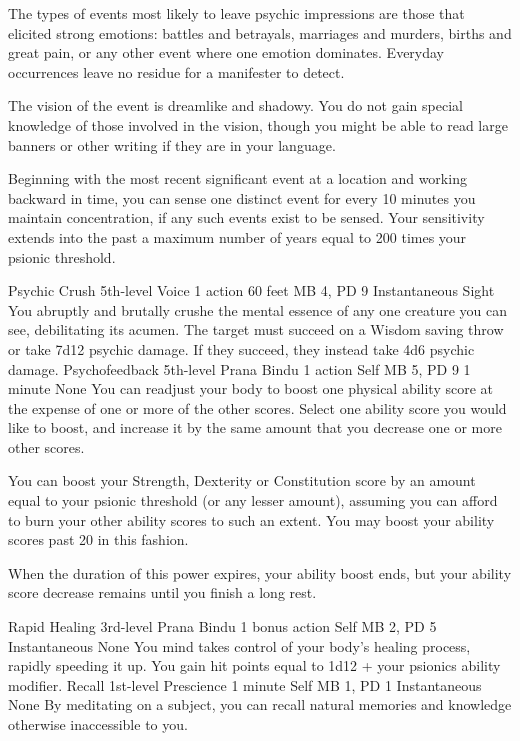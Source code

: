 The types of events most likely to leave psychic impressions
are those that elicited strong emotions: battles and betrayals,
marriages and murders, births and great pain, or any other
event where one emotion dominates. Everyday occurrences leave
no residue for a manifester to detect.

The vision of the event is dreamlike and shadowy. You do not
gain special knowledge of those involved in the vision, though
you might be able to read large banners or other writing if
they are in your language.

Beginning with the most recent significant event at a location
and working backward in time, you can sense one distinct event
for every 10 minutes you maintain concentration, if any such
events exist to be sensed. Your sensitivity extends into the
past a maximum number of years equal to 200 times your psionic
threshold.

\DndPowerHeader%
    {Psychic Crush\label{pwr:psychic_crush}}
    {5th-level Voice}
    {1 action}
    {60 feet}
    {MB 4, PD 9}
    {Instantaneous}
    {Sight}
You abruptly and brutally crushe
the mental essence of any one creature you can see, debilitating
its acumen. The target must succeed on a Wisdom saving throw
or take 7d12 psychic damage. If they succeed, they instead
take 4d6 psychic damage.
\DndPowerHeader%
    {Psychofeedback\label{pwr:psychofeedback}}
    {5th-level Prana Bindu}
    {1 action}
    {Self}
    {MB 5, PD 9}
    {1 minute}
    {None}
You can readjust your body to boost one physical
ability score at the expense of one or more of the other scores.
Select one ability score you would like to boost, and increase
it by the same amount that you decrease one or more other
scores.

You can boost your Strength, Dexterity or Constitution score
by an amount equal to your psionic threshold (or any lesser
amount), assuming you can afford to burn your other ability
scores to such an extent. You may boost your ability scores
past 20 in this fashion.

When the duration of this power expires, your ability boost
ends, but your ability score decrease remains until you
finish a long rest.

\DndPowerHeader%
    {Rapid Healing\label{pwr:rapid_healing}}
    {3rd-level Prana Bindu}
    {1 bonus action}
    {Self}
    {MB 2, PD 5}
    {Instantaneous}
    {None}
You mind takes control of your body's healing
process, rapidly speeding it up. You gain hit points equal
to 1d12 + your psionics ability modifier.
\DndPowerHeader%
    {Recall\label{pwr:recall}}
    {1st-level Prescience}
    {1 minute}
    {Self}
    {MB 1, PD 1}
    {Instantaneous}
    {None}
By meditating on a subject, you can recall
natural memories and knowledge otherwise inaccessible to you.

